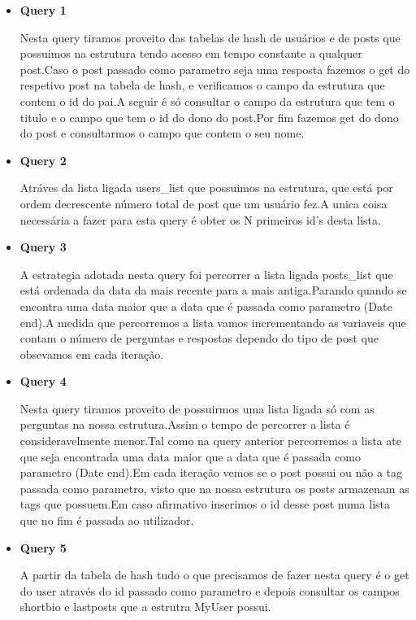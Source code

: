 \documentclass[a4paper,10pt]{article}
\begin{document}
    \begin{itemize}
    
    \item \textbf{Query 1}
    
    \quad\quad Nesta query tiramos proveito das tabelas de hash de usu\'arios e de posts que possuimos na estrutura tendo acesso em tempo constante a qualquer post.Caso o post passado como parametro seja uma resposta fazemos o get do respetivo post na tabela de hash, e verificamos o campo da estrutura que contem o id do pai.A seguir \'e s\'o consultar o campo da estrutura que tem o titulo e o campo que tem o id do dono do post.Por fim fazemos get do dono do post e consultarmos o campo que contem o seu nome.
    
    \item \textbf{Query 2}
    
    \quad\quad Atráves da lista ligada users\_list que possuimos na estrutura, que est\'a por ordem decrescente n\'umero total de post que um usu\'ario fez.A unica coisa necess\'aria a fazer para esta query \'e obter os N primeiros id's desta lista.
    
    \item \textbf{Query 3}
    
    \quad\quad A estrategia adotada nesta query foi percorrer a lista ligada posts\_list que est\'a ordenada da data da mais recente para a mais antiga.Parando quando se encontra uma data maior que a data que \'e passada como parametro (Date end).A medida que percorremos a lista vamos incrementando as variaveis que contam o n\'umero de perguntas e respostas dependo do tipo de post que obsevamos em cada  itera\c{c}\~ao.

  \item \textbf{Query 4}
    
    \quad\quad Nesta query tiramos proveito de possuirmos uma lista ligada s\'o com as perguntas na nossa estrutura.Assim o tempo de percorrer a lista \'e consideravelmente menor.Tal como na query anterior percorremos a lista ate que seja encontrada uma data maior que a data que \'e passada como parametro (Date end).Em cada itera\c{c}\~ao vemos se o post possui ou não a tag passada como parametro, visto que na nossa estrutura os posts armazenam as tags que possuem.Em caso afirmativo inserimos o id desse post numa lista que no fim \'e passada ao utilizador.

  \item \textbf{Query 5}
    
    \quad\quad A partir da tabela de hash tudo o que precisamos de fazer nesta query \'e o get do user atrav\'es do id passado como parametro e depois consultar os campos shortbio e lastposts que a estrutra MyUser possui.


\end{itemize}
\end{document}
